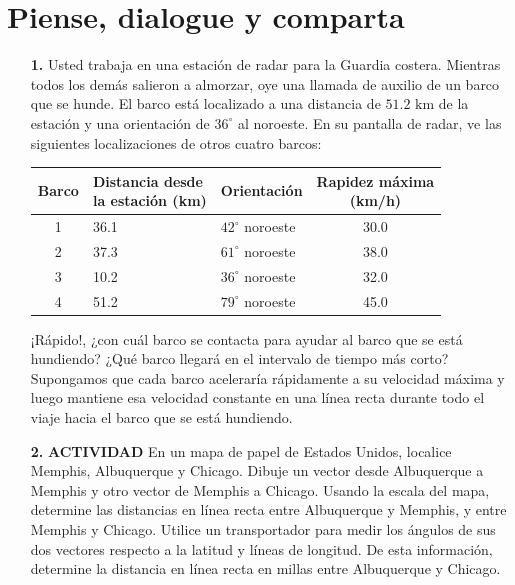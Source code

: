 \documentclass[11pt,a4paper]{article}
\begin{document}
\section*{Piense, dialogue y comparta}

\begin{itemize}
    \item[\textbf{1.}] Usted trabaja en una estación de radar para la Guardia costera. Mientras todos los demás salieron a almorzar, oye una llamada de auxilio de un barco que se hunde. El barco está localizado a una distancia de $51.2 \text{ km}$ de la estación y una orientación de $36^\circ$ al noroeste. En su pantalla de radar, ve las siguientes localizaciones de otros cuatro barcos:
    \begin{center}
    \begin{tabular}{cllc}
    \hline
    Barco & \shortstack{Distancia desde \\ la estación (km)} & Orientación & \shortstack{Rapidez máxima \\ (km/h)} \\
    \hline
    1 & 36.1 & $42^\circ$ noroeste & 30.0 \\
    2 & 37.3 & $61^\circ$ noroeste & 38.0 \\
    3 & 10.2 & $36^\circ$ noroeste & 32.0 \\
    4 & 51.2 & $79^\circ$ noroeste & 45.0 \\
    \hline
    \end{tabular}
    \end{center}
    ¡Rápido!, ¿con cuál barco se contacta para ayudar al barco que se está hundiendo? ¿Qué barco llegará en el intervalo de tiempo más corto? Supongamos que cada barco aceleraría rápidamente a su velocidad máxima y luego mantiene esa velocidad constante en una línea recta durante todo el viaje hacia el barco que se está hundiendo.
    \vspace*{9cm}

    \item[\textbf{2.}] \textbf{ACTIVIDAD} En un mapa de papel de Estados Unidos, localice Memphis, Albuquerque y Chicago. Dibuje un vector desde Albuquerque a Memphis y otro vector de Memphis a Chicago. Usando la escala del mapa, determine las distancias en línea recta entre Albuquerque y Memphis, y entre Memphis y Chicago. Utilice un transportador para medir los ángulos de sus dos vectores respecto a la latitud y líneas de longitud. De esta información, determine la distancia en línea recta en millas entre Albuquerque y Chicago.
    \vspace*{8cm}
\end{itemize}
\end{document}

